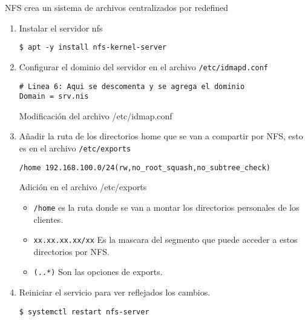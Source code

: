\documentclass[../main.tex]{subfiles}
\begin{document}
NFS crea un sistema de archivos centralizados por redefined
\begin{enumerate}
  \item Instalar el servidor nfs

        \begin{listing}[H]
\begin{verbatim}
$ apt -y install nfs-kernel-server
\end{verbatim}
\end{listing}

  \item Configurar el dominio del servidor en el
        archivo \texttt{/etc/idmapd.conf}

        \begin{listing}[H]
\begin{verbatim}
# Linea 6: Aqui se descomenta y se agrega el dominio
Domain = srv.nis
\end{verbatim}
    \caption{Modificación del archivo /etc/idmap.conf}
    \label{listing:idmapd}
\end{listing}

  \item Añadir la ruta de los directorios home que se van a
        compartir por NFS, esto es en el archivo \texttt{/etc/exports}

        \begin{listing}[H]
\begin{verbatim}
/home 192.168.100.0/24(rw,no_root_squash,no_subtree_check) 
\end{verbatim}
    \caption{Adición en el archivo /etc/exports}
    \label{listing:exports}
\end{listing}

        \begin{itemize}
          \item \texttt{/home} es la ruta donde se van a montar
                los directorios personales de los clientes.
          \item \texttt{xx.xx.xx.xx/xx} Es la mascara del segmento que
                puede acceder a estos directorios por NFS.\@
          \item \texttt{(..*)} Son las opciones de exports.
        \end{itemize}


  \item Reiniciar el servicio para ver reflejados los cambios.

        \begin{listing}[H]
\begin{verbatim}
$ systemctl restart nfs-server
\end{verbatim}
\end{listing}

\end{enumerate}
\end{document}
